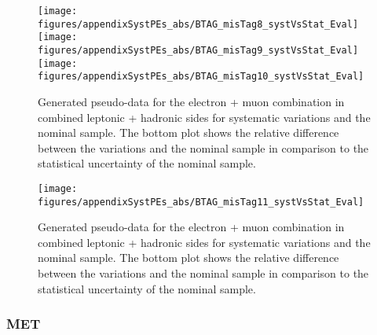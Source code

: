 \begin{figure}[!hb]
\begin{center}
        \texttt{[image: figures/appendixSystPEs\_abs/BTAG\_misTag8\_systVsStat\_Eval]}\\
        \texttt{[image: figures/appendixSystPEs\_abs/BTAG\_misTag9\_systVsStat\_Eval]}\\
        \texttt{[image: figures/appendixSystPEs\_abs/BTAG\_misTag10\_systVsStat\_Eval]}\\

        \caption{Generated pseudo-data for the electron + muon combination in combined leptonic + hadronic sides for systematic variations and the nominal \ttbar sample. The bottom plot shows the relative difference between the variations and the nominal sample in comparison to the statistical uncertainty of the nominal sample.}   
        \label{fig:systematicVar_lephad_Btag_4_1}
        \end{center}                          
        \end{figure}

\begin{figure}[!hb]
\begin{center}
        \texttt{[image: figures/appendixSystPEs\_abs/BTAG\_misTag11\_systVsStat\_Eval]}\\

        \caption{Generated pseudo-data for the electron + muon combination in combined leptonic + hadronic sides for systematic variations and the nominal \ttbar sample. The bottom plot shows the relative difference between the variations and the nominal sample in comparison to the statistical uncertainty of the nominal sample.}   
        \label{fig:systematicVar_lephad_Btag_4_2}
        \end{center}                          
        \end{figure}




\clearpage
\subsubsection{MET}


